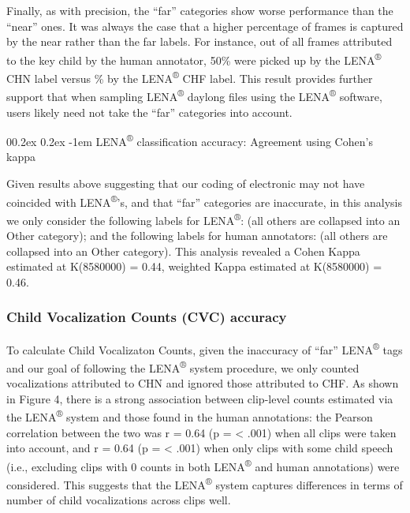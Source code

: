 \documentclass[english,table,man,floatsintext]{apa6}
\makeatletter
\let\oldparagraph\paragraph
\renewcommand{\paragraph}[1]{\oldparagraph{#1}\mbox{}}
\renewcommand{\paragraph}{\@startsection{paragraph}{4}{\parindent}%
  {0\baselineskip \@plus 0.2ex \@minus 0.2ex}%
  {-1em}%
  {\normalfont\normalsize\bfseries\itshape\typesectitle}}
\makeatother
\begin{document}
Finally, as with precision, the \enquote{far} categories show worse performance than the \enquote{near} ones. It was always the case that a higher percentage of frames is captured by the near rather than the far labels. For instance, out of all frames attributed to the key child by the human annotator, 50\% were picked up by the LENA\textsuperscript{®} CHN label versus \% by the LENA\textsuperscript{®} CHF label. This result provides further support that when sampling LENA\textsuperscript{®} daylong files using the LENA\textsuperscript{®} software, users likely need not take the \enquote{far} categories into account.

\hypertarget{lena-classification-accuracy-agreement-using-cohens-kappa}{%
\paragraph{\texorpdfstring{LENA\textsuperscript{®} classification accuracy: Agreement using Cohen's kappa}{LENA® classification accuracy: Agreement using Cohen's kappa}}\label{lena-classification-accuracy-agreement-using-cohens-kappa}}

Given results above suggesting that our coding of electronic may not have coincided with LENA\textsuperscript{®}'s, and that \enquote{far} categories are inaccurate, in this analysis we only consider the following labels for LENA\textsuperscript{®}: (all others are collapsed into an Other category); and the following labels for human annotators: (all others are collapsed into an Other category). This analysis revealed a Cohen Kappa estimated at K(8580000) = 0.44, weighted Kappa estimated at K(8580000) = 0.46.

\hypertarget{child-vocalization-counts-cvc-accuracy}{%
\subsubsection{Child Vocalization Counts (CVC) accuracy}\label{child-vocalization-counts-cvc-accuracy}}

To calculate Child Vocalizaton Counts, given the inaccuracy of \enquote{far} LENA\textsuperscript{®} tags and our goal of following the LENA\textsuperscript{®} system procedure, we only counted vocalizations attributed to CHN and ignored those attributed to CHF. As shown in Figure 4, there is a strong association between clip-level counts estimated via the LENA\textsuperscript{®} system and those found in the human annotations: the Pearson correlation between the two was r = 0.64 (p = \textless{} .001) when all clips were taken into account, and r = 0.64 (p = \textless{} .001) when only clips with some child speech (i.e., excluding clips with 0 counts in both LENA\textsuperscript{®} and human annotations) were considered. This suggests that the LENA\textsuperscript{®} system captures differences in terms of number of child vocalizations across clips well.
\end{document}
